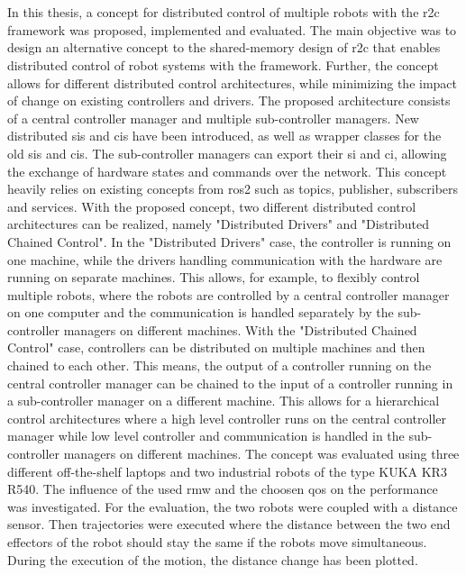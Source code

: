 \chapter{}
\label{sec:conclusion_and_outlook}
In  this thesis, a concept for distributed control of multiple robots with the \gls{r2c} framework was proposed, implemented and evaluated. The main objective was to design an alternative concept to the shared-memory design of \gls{r2c} that enables distributed control of robot systems with the framework. Further, the concept allows for different distributed control architectures, while minimizing the impact of change on existing controllers and drivers. \newline
The proposed architecture consists of a central controller manager and multiple sub-controller managers. New distributed \glspl{si} and \glspl{ci} have been introduced, as well as wrapper classes for the old \glspl{si} and \glspl{ci}. The sub-controller managers can export their \gls{si} and \gls{ci}, allowing the exchange of hardware states and commands over the network. This concept heavily relies  on existing concepts from \gls{ros2} such as topics, publisher, subscribers and services.\newline
With the proposed concept, two different distributed control architectures can be realized, namely "Distributed Drivers" and "Distributed Chained Control". In the "Distributed Drivers" case, the controller is running on one machine, while the drivers handling communication with the hardware are running on separate machines. This allows, for example, to flexibly control multiple robots, where the robots are controlled by a central controller manager on one computer and the communication is handled separately by the sub-controller managers on different machines. With the "Distributed Chained Control" case, controllers can be distributed on multiple machines and then chained to each other. This means, the output of a controller running on the central controller manager can be chained to the input of a controller running in a sub-controller manager on a different machine. This allows for a hierarchical control architectures where a high level controller runs on the central controller manager while low level controller and communication is handled in the sub-controller managers on different machines.\newline
The concept was evaluated using three different off-the-shelf laptops and two industrial robots of the type KUKA KR3 R540. The influence of the used \gls{rmw} and the choosen \gls{qos} on the performance was investigated. For the evaluation, the two robots were coupled with a distance sensor. Then trajectories were executed where the distance between the two end effectors of the robot should stay the same if the robots move simultaneous. During the execution of the motion, the distance change has been plotted.\newline
